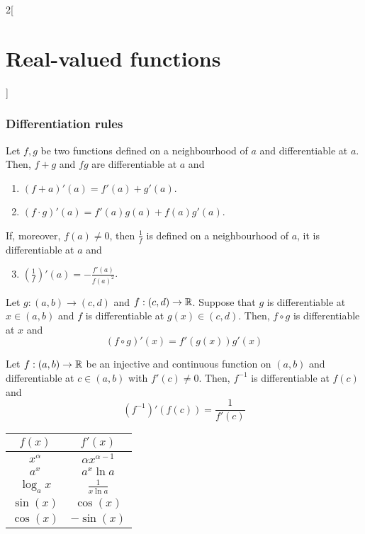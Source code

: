 \documentclass[../../../main.tex]{subfiles}
\begin{document}
\begin{multicols}{2}[\section{Real-valued functions}]
  \subsubsection{Differentiation rules}
  \begin{prop}
    Let $f,g$ be two functions defined on a neighbourhood of $a$ and differentiable at $a$. Then, $f+g$ and $fg$ are differentiable at $a$ and
    \begin{enumerate}
      \item $(f+a)'(a)=f'(a)+g'(a)$.
      \item $(f\cdot g)'(a)=f'(a)g(a)+f(a)g'(a)$.
    \end{enumerate}
    If, moreover, $f(a)\ne 0$, then $\frac{1}{f}$ is defined on a neighbourhood of $a$, it is differentiable at $a$ and
    \begin{enumerate}\setcounter{enumi}{2}
      \item $\displaystyle\left(\frac{1}{f}\right)'(a)=-\frac{f'(a)}{{f(a)}^2}$.
    \end{enumerate}
  \end{prop}
  \begin{prop}
    Let $g:(a,b)\rightarrow(c,d)$ and $f:(c,d)\rightarrow\mathbb{R}$. Suppose that $g$ is differentiable at $x\in(a,b)$ and $f$ is differentiable at $g(x)\in(c,d)$. Then, $f\circ g$ is differentiable at $x$ and $$(f\circ g)'(x)=f'(g(x))g'(x)$$
  \end{prop}
  \begin{prop}
    Let $f:(a,b)\rightarrow\mathbb{R}$ be an injective and continuous function on $(a,b)$ and differentiable at $c\in(a,b)$ with $f'(c)\ne 0$. Then, $f^{-1}$ is differentiable at $f(c)$ and $$(f^{-1})'(f(c))=\frac{1}{f'(c)}$$
  \end{prop}
  \begin{center}
    \renewcommand{\arraystretch}{1.5}
    \begin{tabular}{|c|c|}
      \hline
      $f(x)$       & $f'(x)$                                           \\
      \hline
      $x^\alpha$   & $\alpha x^{\alpha-1}$                             \\
      $a^x$        & $a^x\ln a$                                        \\
      $\log_a x$   & $\displaystyle \frac{1}{x\ln a}$                  \\
      $\sin(x)$    & $\cos(x)$                                         \\
      $\cos(x)$    & $-\sin(x)$                                        \\

\end{tabular}
\end{center}
\end{multicols}
\end{document}
